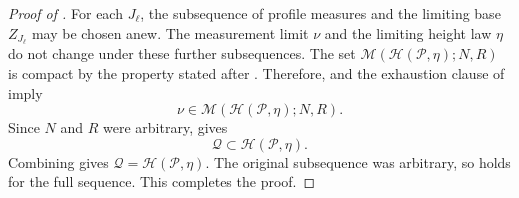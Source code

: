 \documentclass[10pt,a4paper]{amsart}
\numberwithin{equation}{section}
\begin{document}
\begin{proof}[Proof of ]
For each $J_\ell$, the subsequence of profile measures and the limiting base $Z_{J_\ell}$ may be chosen anew.  The
measurement limit $\nu$ and the limiting height law $\eta$ do not change under these further subsequences.  The set
$\mathcal M(\mathcal H(\mathcal P,\eta);N,R)$ is compact by the property stated after
.  Therefore,
 and the exhaustion clause of
 imply
\[
 \nu\in\mathcal M(\mathcal H(\mathcal P,\eta);N,R).
\]
Since $N$ and $R$ were arbitrary,  gives
\begin{equation}\label{eq:joint-horocone-upper-inclusion}
 \mathcal Q\subset\mathcal H(\mathcal P,\eta).
\end{equation}
Combining  gives
$\mathcal Q=\mathcal H(\mathcal P,\eta)$.  The original subsequence was arbitrary, so
 holds for the full sequence.  This completes the proof.
\end{proof}
\end{document}
